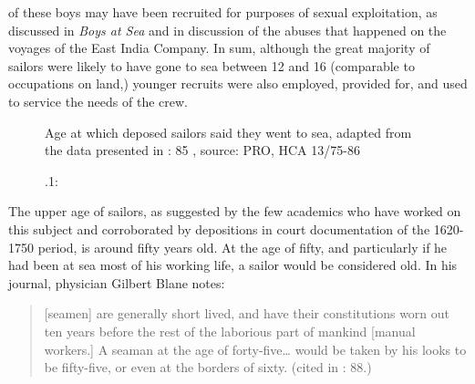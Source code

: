 of these boys may have been recruited for purposes of sexual exploitation, as discussed in  \textit{Boys at Sea} and in  discussion of the abuses that happened on the voyages of the East India Company. In sum, although the great majority of sailors were likely to have gone to sea between 12 and 16 (comparable to occupations on land,) younger recruits were also employed, provided for, and used to service the needs of the crew.


\begin{figure}

\caption{\label{fig:key:3}.1:} Age at which deposed sailors said they went to sea, adapted from the data presented in \citealt{Earle1998}: 85 , source: PRO, HCA 13/75-86

 
\end{figure}

The upper age of sailors, as suggested by the few academics who have worked on this subject and corroborated by depositions in court documentation of the 1620-1750 period, is around fifty years old. At the age of fifty, and particularly if he had been at sea most of his working life, a sailor would be considered old.  In his journal, physician Gilbert Blane notes:

\begin{quotation}
[seamen] are generally short lived, and have their constitutions worn out ten years before the rest of the laborious part of mankind [manual workers.] A seaman at the age of forty-five… would be taken by his looks to be fifty-five, or even at the borders of sixty. (cited in \citealt{AdkinsAdkins2008}: 88.) \end{quotation}

